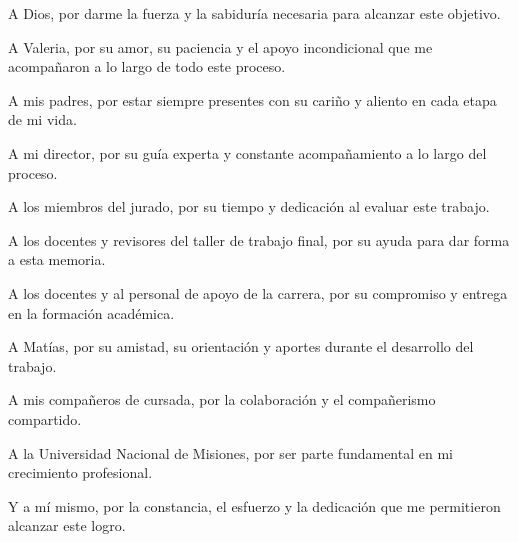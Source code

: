 \documentclass[
    11pt,
    spanish,
    singlespacing,
    parskip,
    headsepline,
    bookmarks=true,
    unicode=true,
    pdftoolbar=true,
    pdfmenubar=true,
    pdffitwindow=false,
    colorlinks=true,
    linkcolor=blue,
    citecolor=blue,
    urlcolor=blue
]{MastersDoctoralThesis}
\def\textbf#1{#1}%
\begin{document}
\begin{acknowledgements}
  \vspace{1.5cm}
  A Dios, por darme la fuerza y la sabiduría necesaria para alcanzar este objetivo.

  A Valeria, por su amor, su paciencia y el apoyo incondicional que me
  acompañaron a lo largo de todo este proceso.

  A mis padres, por estar siempre presentes con su cariño y aliento en cada etapa
  de mi vida.

  A mi director, por su guía experta y constante acompañamiento a lo largo del
  proceso.

  A los miembros del jurado, por su tiempo y dedicación al evaluar este trabajo.

  A los docentes y revisores del taller de trabajo final, por su ayuda para dar
  forma a esta memoria.

  A los docentes y al personal de apoyo de la carrera, por su compromiso y
  entrega en la formación académica.

  A Matías, por su amistad, su orientación y aportes durante el desarrollo del
  trabajo.

  A mis compañeros de cursada, por la colaboración y el compañerismo compartido.

  A la Universidad Nacional de Misiones, por ser parte fundamental en mi
  crecimiento profesional.

  Y a mí mismo, por la constancia, el esfuerzo y la dedicación que me permitieron
  alcanzar este logro.

\end{acknowledgements}


\tableofcontents
\listoffigures
\listoftables



\end{document}
